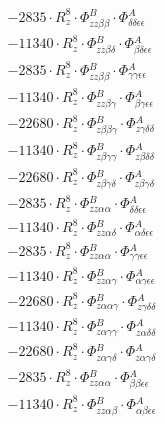 \documentclass{article}
\begin{document}
\begin{subequations}
\begin{gather}
\begin{array}{c}
 \\[0.2em] 		 - 2835 \cdot R_{z}^{8} \cdot \Phi{}^{B}_{zz\beta{}\beta{}} \cdot \Phi{}^{A}_{\delta{}\delta{}\epsilon{}\epsilon{}} 
 \\[0.2em] 		 - 11340 \cdot R_{z}^{8} \cdot \Phi{}^{B}_{zz\beta{}\delta{}} \cdot \Phi{}^{A}_{\beta{}\delta{}\epsilon{}\epsilon{}} 
 \\[0.2em] 		 - 2835 \cdot R_{z}^{8} \cdot \Phi{}^{B}_{zz\beta{}\beta{}} \cdot \Phi{}^{A}_{\gamma{}\gamma{}\epsilon{}\epsilon{}} 
 \\[0.2em] 		 - 11340 \cdot R_{z}^{8} \cdot \Phi{}^{B}_{zz\beta{}\gamma{}} \cdot \Phi{}^{A}_{\beta{}\gamma{}\epsilon{}\epsilon{}} 
 \\[0.2em] 		 - 22680 \cdot R_{z}^{8} \cdot \Phi{}^{B}_{z\beta{}\beta{}\gamma{}} \cdot \Phi{}^{A}_{z\gamma{}\delta{}\delta{}} 
 \\[0.2em] 		 - 11340 \cdot R_{z}^{8} \cdot \Phi{}^{B}_{z\beta{}\gamma{}\gamma{}} \cdot \Phi{}^{A}_{z\beta{}\delta{}\delta{}} 
 \\[0.2em] 		 - 22680 \cdot R_{z}^{8} \cdot \Phi{}^{B}_{z\beta{}\gamma{}\delta{}} \cdot \Phi{}^{A}_{z\beta{}\gamma{}\delta{}} 
 \\[0.2em] 		 - 2835 \cdot R_{z}^{8} \cdot \Phi{}^{B}_{zz\alpha{}\alpha{}} \cdot \Phi{}^{A}_{\delta{}\delta{}\epsilon{}\epsilon{}} 
 \\[0.2em] 		 - 11340 \cdot R_{z}^{8} \cdot \Phi{}^{B}_{zz\alpha{}\delta{}} \cdot \Phi{}^{A}_{\alpha{}\delta{}\epsilon{}\epsilon{}} 
 \\[0.2em] 		 - 2835 \cdot R_{z}^{8} \cdot \Phi{}^{B}_{zz\alpha{}\alpha{}} \cdot \Phi{}^{A}_{\gamma{}\gamma{}\epsilon{}\epsilon{}} 
 \\[0.2em] 		 - 11340 \cdot R_{z}^{8} \cdot \Phi{}^{B}_{zz\alpha{}\gamma{}} \cdot \Phi{}^{A}_{\alpha{}\gamma{}\epsilon{}\epsilon{}} 
 \\[0.2em] 		 - 22680 \cdot R_{z}^{8} \cdot \Phi{}^{B}_{z\alpha{}\alpha{}\gamma{}} \cdot \Phi{}^{A}_{z\gamma{}\delta{}\delta{}} 
 \\[0.2em] 		 - 11340 \cdot R_{z}^{8} \cdot \Phi{}^{B}_{z\alpha{}\gamma{}\gamma{}} \cdot \Phi{}^{A}_{z\alpha{}\delta{}\delta{}} 
 \\[0.2em] 		 - 22680 \cdot R_{z}^{8} \cdot \Phi{}^{B}_{z\alpha{}\gamma{}\delta{}} \cdot \Phi{}^{A}_{z\alpha{}\gamma{}\delta{}} 
 \\[0.2em] 		 - 2835 \cdot R_{z}^{8} \cdot \Phi{}^{B}_{zz\alpha{}\alpha{}} \cdot \Phi{}^{A}_{\beta{}\beta{}\epsilon{}\epsilon{}} 
 \\[0.2em] 		 - 11340 \cdot R_{z}^{8} \cdot \Phi{}^{B}_{zz\alpha{}\beta{}} \cdot \Phi{}^{A}_{\alpha{}\beta{}\epsilon{}\epsilon{}} 

\end{array}
\end{gather}
\end{subequations}
\end{document}
